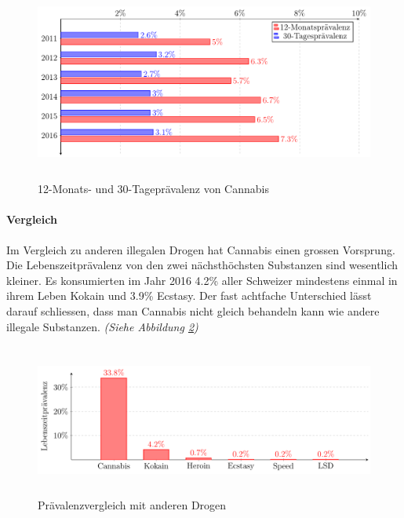 \documentclass[../main.tex]{subfiles}
\begin{document}
	\noindent	 
	\begin{figure}[H]
		\centering
		\includegraphics[height=6.5cm]{../figures/druguse-shorttime}
		\captionsetup{font=small}
		\caption[12-Monats- und 30-Tageprävalenz von Cannabis]{12-Monats- und 30-Tageprävalenz von Cannabis\protect\footnotemark}	
		\label{fig:kurzzeitpravalenz}	
	\end{figure}
	
	\paragraph{Vergleich}
	Im Vergleich zu anderen illegalen Drogen hat Cannabis einen grossen Vorsprung.
	Die Lebenszeitprävalenz von den zwei nächsthöchsten Substanzen sind wesentlich kleiner.
	Es konsumierten im Jahr 2016 4.2\% aller Schweizer mindestens einmal in ihrem Leben Kokain und 3.9\% Ecstasy.
	Der fast achtfache Unterschied lässt darauf schliessen, dass man Cannabis nicht gleich behandeln kann wie andere illegale Substanzen. 
	\textit{(Siehe Abbildung \ref{fig:otherdrugs})}
	
	\noindent
	\begin{figure}[H]
		\centering
		\includegraphics[height=5cm]{../figures/druguse-other}
		\captionsetup{font=small, skip=0pt}
		\caption[Prävalenzvergleich mit anderen Drogen]{Prävalenzvergleich mit anderen Drogen\protect\footnotemark}		
		\label{fig:otherdrugs}
	\end{figure}
	
\end{document}
